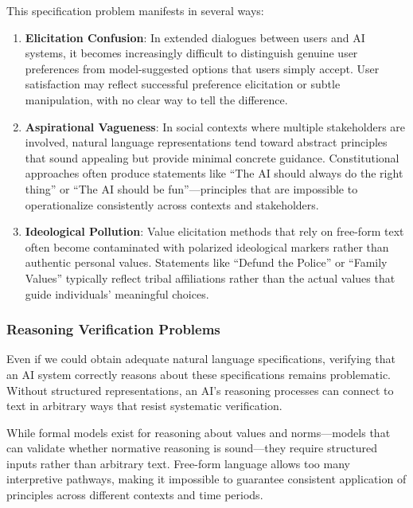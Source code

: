 This specification problem manifests in several ways:

\begin{enumerate}
\item \textbf{Elicitation Confusion}: In extended dialogues between users and AI systems, it becomes increasingly difficult to distinguish genuine user preferences from model-suggested options that users simply accept. User satisfaction may reflect successful preference elicitation or subtle manipulation, with no clear way to tell the difference.

\item \textbf{Aspirational Vagueness}: In social contexts where multiple stakeholders are involved, natural language representations tend toward abstract principles that sound appealing but provide minimal concrete guidance. Constitutional approaches often produce statements like ``The AI should always do the right thing'' or ``The AI should be fun''—principles that are impossible to operationalize consistently across contexts and stakeholders.

\item \textbf{Ideological Pollution}: Value elicitation methods that rely on free-form text often become contaminated with polarized ideological markers rather than authentic personal values. Statements like ``Defund the Police'' or ``Family Values'' typically reflect tribal affiliations rather than the actual values that guide individuals' meaningful choices.
\end{enumerate}

\subsubsection{Reasoning Verification Problems}

Even if we could obtain adequate natural language specifications, verifying that an AI system correctly reasons about these specifications remains problematic. Without structured representations, an AI's reasoning processes can connect to text in arbitrary ways that resist systematic verification.

While formal models exist for reasoning about values and norms—models that can validate whether normative reasoning is sound—they require structured inputs rather than arbitrary text. Free-form language allows too many interpretive pathways, making it impossible to guarantee consistent application of principles across different contexts and time periods.


